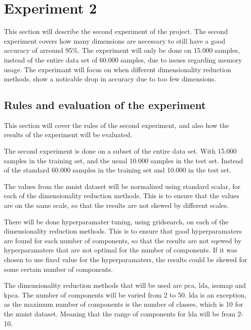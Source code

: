 \section{Experiment 2}\label{sec:experiment_2}
This section will describe the second experiment of the project. The second experiment covers how many dimensions are necessary to still have a good accuracy of arround 95\%. The experiment will only be done on 15.000 samples, instead of the entire data set of 60.000 samples, due to issues regarding memory usage. The experimant will focus on when different dimensionality reduction methods, show a noticable drop in accuracy due to too few dimensions. 


\subsection{Rules and evaluation of the experiment}\label{subsec:experiment_2_rules}
This section will cover the rules of the second experiment, and also how the results of the experiment will be evaluated.

The second experiment is done on a subset of the entire data set. With 15.000 samples in the training set, and the usual 10.000 samples in the test set. Instead of the standard 60.000 samples in the training set and 10.000 in the test set.

The values from the \gls{mnist} dataset will be normalized using standard scalar, for each of the dimensionality reduction methods. This is to ensure that the values are on the same scale, so that the results are not skewed by different scales.

There will be done hyperparamater tuning, using gridsearch, on each of the dimensionality reduction methods. This is to ensure that good hyperparamaters are found for each number of components, so that the results are not sqewed by hyperparamaters that are not optimal for the number of components. If it was chosen to use fixed value for the hyperparamaters, the results could be skewed for some certain number of components.

The dimensionality reduction methods that will be used are \gls{pca}, \gls{lda}, \gls{isomap} and \gls{kpca}. The number of components will be varied from 2 to 50. \gls{lda} is an exception, as the maximum number of components is the number of classes, which is 10 for the \gls{mnist} dataset. Meaning that the range of components for \gls{lda} will be from 2-10.

